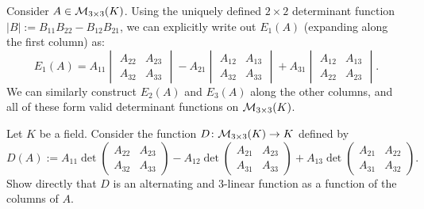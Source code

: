 \begin{example}
  Consider $A \in \mathcal{M}_{3 \times 3}(K)$. Using the uniquely defined $2 \times 2$ determinant function $|B| := B_{11}B_{22} - B_{12}B_{21}$, we can explicitly write out $E_1(A)$ (expanding along the first column) as:
  \[
  E_1(A) = A_{11} \begin{vmatrix} A_{22} & A_{23} \\ A_{32} & A_{33} \end{vmatrix} - A_{21} \begin{vmatrix} A_{12} & A_{13} \\ A_{32} & A_{33} \end{vmatrix} + A_{31} \begin{vmatrix} A_{12} & A_{13} \\ A_{22} & A_{23} \end{vmatrix}.
  \]
  We can similarly construct $E_2(A)$ and $E_3(A)$ along the other columns, and all of these form valid determinant functions on $\mathcal{M}_{3 \times 3}(K)$.
\end{example}

\begin{exercise}
\label{exc:laplace_expansion_3x3_alternating_trilinear}
Let $K$ be a field. Consider the function $D \colon \mathcal{M}_{3 \times 3}(K) \to K$ defined by
\[
D(A) := A_{11} \det \begin{pmatrix} A_{22} & A_{23} \\ A_{32} & A_{33} \end{pmatrix} - A_{12} \det \begin{pmatrix} A_{21} & A_{23} \\ A_{31} & A_{33} \end{pmatrix} + A_{13} \det \begin{pmatrix} A_{21} & A_{22} \\ A_{31} & A_{32} \end{pmatrix}.
\]
Show directly that $D$ is an alternating and $3$-linear function as a function of the columns of $A$.
\end{exercise}

